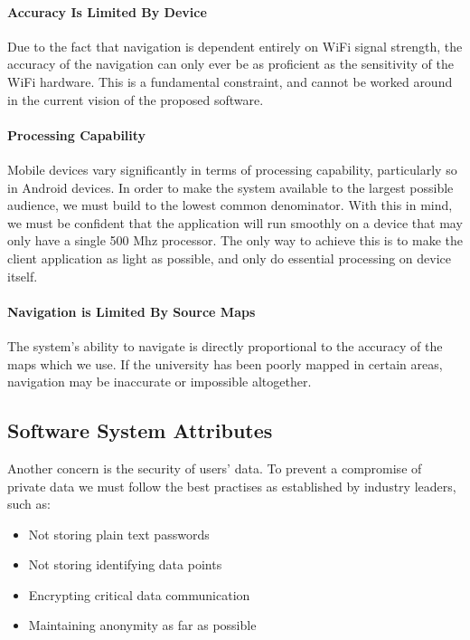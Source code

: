 \documentclass[12pt,a4paper]{article}
\begin{document}
			\paragraph{Accuracy Is Limited By Device}

				Due to the fact that navigation is dependent entirely on WiFi signal
				strength, the accuracy of the navigation can only ever be as proficient
				as the sensitivity of the WiFi hardware. This is a fundamental constraint,
				and cannot be worked around in the current vision of the proposed
				software.

			\paragraph{Processing Capability}

				Mobile devices vary significantly in terms of processing capability,
				particularly so in Android devices. In order to make the system
				available to the largest possible audience, we must build to the lowest
				common denominator. With this in mind, we must be confident that the
				application will run smoothly on a device that may only have a single
				500 Mhz processor. The only way to achieve this is to make the client
				application as light as possible, and only do essential processing on
				device itself.

				\paragraph{Navigation is Limited By Source Maps}

				The system's ability to navigate is directly proportional to the accuracy
				of the maps which we use. If the university has been poorly mapped in
				certain areas, navigation may be inaccurate or impossible altogether.

		\subsection{Software System Attributes}

			Another concern is the security of users' data. To prevent a compromise of
			private data we must follow the best practises as established by industry
			leaders, such as:

			\begin{itemize}
				\item Not storing plain text passwords
				\item Not storing identifying data points
				\item Encrypting critical data communication
				\item Maintaining anonymity as far as possible
			\end{itemize}
\end{document}

